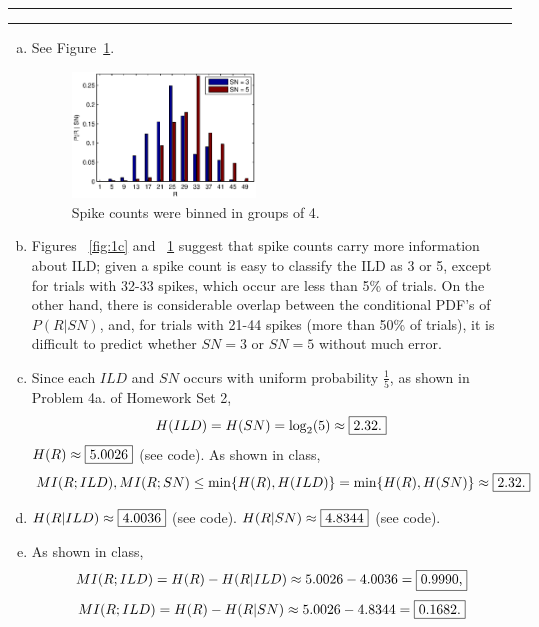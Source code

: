 \documentclass[11pt]{article}
\newcounter{questionCounter}
\newcounter{partCounter}[questionCounter]
\newenvironment{question}[2][\arabic{questionCounter}]{%
    \setcounter{partCounter}{0}%
    \vspace{.25in} \hrule \vspace{0.5em}%
        \noindent{\bf #2}%
    \vspace{0.8em} \hrule \vspace{.10in}%
    \addtocounter{questionCounter}{1}%
}{}
\begin{document}
\begin{question}{Problem 1}
\begin{enumerate}[a.]
\item
See Figure~\ref{fig:1d}.
\begin{figure}[h]
\begin{center}
\includegraphics[width=0.46\textwidth]{1d}
\end{center}
\caption{Spike counts were binned in groups of 4.}
\label{fig:1d}
\end{figure}

\item Figures ~\ref{fig:1c} and ~\ref{fig:1d} suggest that spike counts carry
more information about ILD; given a spike count is easy to classify the ILD as
3 or 5, except for trials with 32-33 spikes, which occur are less than 5\% of
trials. On the other hand, there is considerable overlap between the conditional
PDF's of $P(R | SN)$, and, for trials with 21-44 spikes (more than 50\% of
trials), it is difficult to predict whether $SN = 3$ or $SN = 5$ without much
error.

\item Since each $ILD$ and $SN$ occurs with uniform probability $\frac15$, as
shown in Problem 4a. of Homework Set 2,
\[H(ILD) = H(SN) = \log_2(5) \approx \mbox{\fbox{$2.32$.}}\]
$H(R) \approx \mbox{\fbox{$5.0026$}}$ (see code).
As shown in class,
\[MI(R;ILD),MI(R;SN)
 \leq    \min\{H(R),H(ILD)\}
 =       \min\{H(R),H(SN)\}
 \approx \mbox{\fbox{$2.32$.}}\]

\item
$H(R | ILD) \approx \mbox{\fbox{$4.0036$}}$ (see code).
$H(R | SN)  \approx \mbox{\fbox{$4.8344$}}$ (see code).

\item As shown in class,
\[MI(R;ILD)
 =       H(R) - H(R | ILD)
 \approx 5.0026 - 4.0036
 =       \mbox{\fbox{$0.9990$,}}\]
\[MI(R;ILD)
 =       H(R) - H(R |SN)
 \approx 5.0026 - 4.8344
 =       \mbox{\fbox{$0.1682$.}}\]

\end{enumerate}
\end{question}
\end{document}
